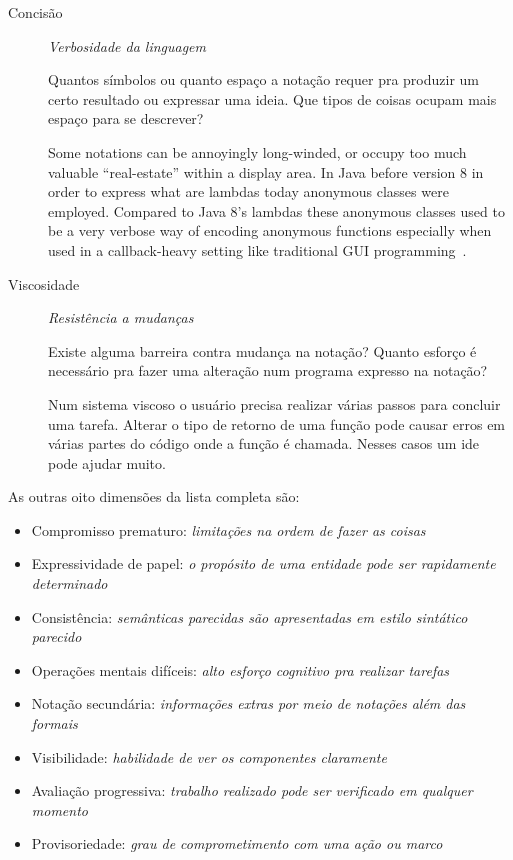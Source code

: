 \begin{description}
\item[{Concisão        }] \emph{Verbosidade da linguagem}

Quantos símbolos ou quanto espaço a notação requer pra produzir um certo
resultado ou expressar uma ideia. Que tipos de coisas ocupam mais espaço
para se descrever?

\begin{citacao}
  Some notations can be annoyingly long-winded, or occupy too much valuable
  “real-estate” within a display area. In Java before version 8 in order to
  express what are lambdas today anonymous classes were employed. Compared to
  Java 8’s lambdas these anonymous classes used to be a very verbose way of
  encoding anonymous functions especially when used in a callback-heavy setting
  like traditional GUI programming~\cite[p.~14]{kiss2014}.
\end{citacao}

\item[{Viscosidade    }] \emph{Resistência a mudanças}

Existe alguma barreira contra mudança na notação? Quanto esforço é
necessário pra fazer uma alteração num programa expresso na notação?

Num sistema viscoso o usuário precisa realizar várias passos para
concluir uma tarefa. Alterar o tipo de retorno de uma função pode causar
erros em várias partes do código onde a função é chamada. Nesses casos um
\gls{ide} pode ajudar muito.
\end{description}


As outras oito dimensões da lista completa são:

\begin{itemize}
\item Compromisso prematuro: \emph{limitações na ordem de fazer as coisas}
\item Expressividade de papel: \emph{o propósito de uma entidade pode ser rapidamente determinado}
\item Consistência: \emph{semânticas parecidas são apresentadas em estilo sintático
parecido}
\item Operações mentais difíceis: \emph{alto esforço cognitivo pra realizar tarefas}
\item Notação secundária: \emph{informações extras por meio de notações além das
formais}
\item Visibilidade: \emph{habilidade de ver os componentes claramente}
\item Avaliação progressiva: \emph{trabalho realizado pode ser verificado em qualquer
momento}
\item Provisoriedade: \emph{grau
de comprometimento com uma ação ou marco}
\end{itemize}
